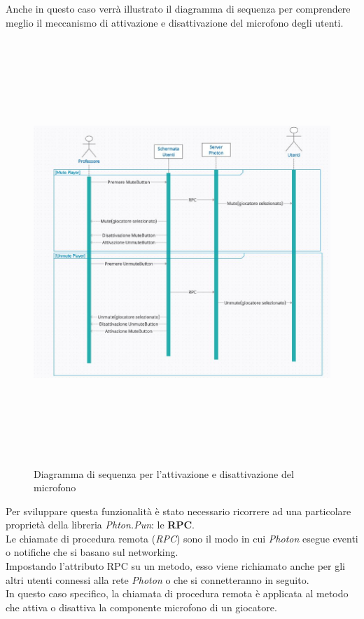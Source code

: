 Anche in questo caso verrà illustrato il diagramma di sequenza per comprendere meglio il meccanismo di attivazione e disattivazione del microfono degli utenti.
    \begin{figure}[H]
    \centering
    \includegraphics[width = 16cm, height = 16cm]{Immagini/muteunmutediag.jpg}
    \caption{Diagramma di sequenza per l'attivazione e disattivazione del microfono}
    \label{fig:my_label}
\end{figure}
\hspace{-0.6cm}Per sviluppare questa funzionalità è stato necessario ricorrere ad una particolare proprietà della libreria \textit{Phton.Pun}: le \textbf{RPC}.
\\Le chiamate di procedura remota (\textit{RPC}) sono il modo in cui \textit{Photon} esegue eventi o notifiche che si basano sul networking.
\\Impostando l'attributo RPC su un metodo, esso viene richiamato anche per gli altri utenti connessi alla rete \textit{Photon} o che si connetteranno in seguito.
\\In questo caso specifico, la chiamata di procedura remota è applicata al metodo che attiva o disattiva la componente microfono di un giocatore.